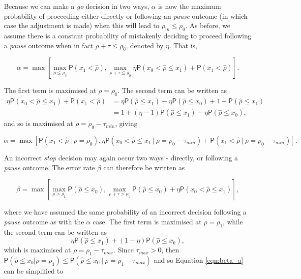 \documentclass{bmcart}
\newcommand{\PR}{{\mathsf P}}
\begin{document}
Because we can make a \emph{go} decision in two ways, $\alpha$ is now the maximum probability of proceeding either directly or following an \emph{pause} outcome (in which case the adjustment is made) when this will lead to $\rho_m \leq \rho_0$. As before, we assume there is a constant probability of mistakenly deciding to proceed following a \emph{pause} outcome when in fact $\rho + \tau \leq \rho_0$, denoted  by $\eta$. That is,

$$
\alpha = \max \left[ \max_{\rho \leq \rho_0} \PR(x_1 < \hat{\rho}), \max_{\rho + \tau \leq \rho_0} \eta \PR(x_0 < \hat{\rho} \leq x_1) + \PR(x_1 < \hat{\rho}) \right].
$$

The first term is maximised at $\rho = \rho_0$. The second term can be written as
$$
\begin{aligned}
\eta \PR(x_0 < \hat{\rho} \leq x_1) + \PR(x_1 < \hat{\rho}) &=
\eta \PR(\hat{\rho} \leq x_1) - \eta \PR(\hat{\rho} \leq x_0) + 1 - \PR(\hat{\rho} \leq x_1)\\
&= 1 + (\eta - 1)\PR(\hat{\rho} \leq x_1) - \eta \PR(\hat{\rho} \leq x_0),
\end{aligned}
$$
and so is maximised at $\rho = \rho_0 - \tau_{min}$, giving 

\begin{equation}\label{eqn:alpha}
\alpha = \max \left[ \PR(x_1 < \hat{\rho} ~|~ \rho = \rho_0), \eta \PR(x_0 < \hat{\rho} \leq x_1 ~|~ \rho = \rho_0 - \tau_{min}) + \PR(x_1 < \hat{\rho} ~|~ \rho = \rho_0 - \tau_{min}) \right].
\end{equation}

An incorrect \emph{stop} decision may again occur two ways - directly, or following a \emph{pause} outcome. The error rate $\beta$ can therefore be written as

\begin{equation}\label{eqn:beta_a}
\beta = \max \left[ \max_{\rho > \rho_1} \PR(\hat{\rho} \leq x_0), \max_{\rho + \tau > \rho_1} \PR(\hat{\rho} \leq x_0) + \eta \PR(x_0 < \hat{\rho} \leq x_1) \right],
\end{equation}

where we have assumed the same probability of an incorrect decision following a \emph{pause} outcome as with the $\alpha$ case. The first term is maximised at $\rho = \rho_1$, while the second term can be written as
$$
\eta \PR(\hat{\rho} \leq x_1) + (1 - \eta) \PR(\hat{\rho} \leq x_0),
$$
which is maximised at $\rho = \rho_1 - \tau_{max}$. Since $\tau_{max} > 0$, then $\PR(\hat{\rho} \leq x_0 | \rho = \rho_1) \leq \PR(\hat{\rho} \leq x_0 ~|~ \rho = \rho_1  - \tau_{max})$ and so Equation \ref{eqn:beta_a} can be simplified to
\end{document}
